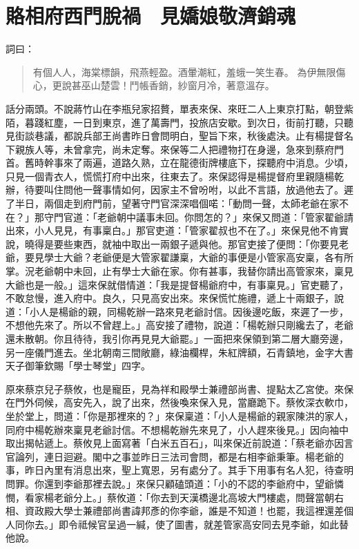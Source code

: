 
\chapter{賂相府西門脫禍　見嬌娘敬濟銷魂}

詞曰：
\begin{quote}
有個人人，海棠標韻，飛燕輕盈。酒暈潮紅，羞蛾一笑生春。
為伊無限傷心，更說甚巫山楚雲！鬥帳香銷，紗窗月冷，著意溫存。
\end{quote}

話分兩頭。不說蔣竹山在李瓶兒家招贅，單表來保、來旺二人上東京打點，朝登紫陌，暮踐紅塵，一日到東京，進了萬壽門，投旅店安歇。到次日，街前打聽，只聽見街談巷議，都說兵部王尚書昨日會問明白，聖旨下來，秋後處決。止有楊提督名下親族人等，未曾拿完，尚未定奪。來保等二人把禮物打在身邊，急來到蔡府門首。舊時幹事來了兩遍，道路久熟，立在龍德街牌樓底下，探聽府中消息。少頃，只見一個青衣人，慌慌打府中出來，往東去了。來保認得是楊提督府里親隨楊乾辦，待要叫住問他一聲事情如何，因家主不曾吩咐，以此不言語，放過他去了。遲了半日，兩個走到府門前，望著守門官深深唱個喏：「動問一聲，太師老爺在家不在？」那守門官道：「老爺朝中議事未回。你問怎的？」來保又問道：「管家翟爺請出來，小人見見，有事稟白。」那官吏道：「管家翟叔也不在了。」來保見他不肯實說，曉得是要些東西，就袖中取出一兩銀子遞與他。那官吏接了便問：「你要見老爺，要見學士大爺？老爺便是大管家翟謙稟，大爺的事便是小管家高安稟，各有所掌。況老爺朝中未回，止有學士大爺在家。你有甚事，我替你請出高管家來，稟見大爺也是一般。」這來保就借情道：「我是提督楊爺府中，有事稟見。」官吏聽了，不敢怠慢，進入府中。良久，只見高安出來。來保慌忙施禮，遞上十兩銀子，說道：「小人是楊爺的親，同楊乾辦一路來見老爺討信。因後邊吃飯，來遲了一步，不想他先來了。所以不曾趕上。」高安接了禮物，說道：「楊乾辦只剛纔去了，老爺還未散朝。你且待待，我引你再見見大爺罷。」一面把來保領到第二層大廳旁邊，另一座儀門進去。坐北朝南三間敞廳，綠油欄桿，朱紅牌額，石青鎮地，金字大書天子御筆欽賜「學士琴堂」四字。

原來蔡京兒子蔡攸，也是寵臣，見為祥和殿學士兼禮部尚書、提點太乙宮使。來保在門外伺候，高安先入，說了出來，然後喚來保入見，當廳跪下。蔡攸深衣軟巾，坐於堂上，問道：「你是那裡來的？」來保稟道：「小人是楊爺的親家陳洪的家人，同府中楊乾辦來稟見老爺討信。不想楊乾辦先來見了，小人趕來後見。」因向袖中取出揭帖遞上。蔡攸見上面寫著「白米五百石」，叫來保近前說道：「蔡老爺亦因言官論列，連日迴避。閣中之事並昨日三法司會問，都是右相李爺秉筆。楊老爺的事，昨日內里有消息出來，聖上寬恩，另有處分了。其手下用事有名人犯，待查明問罪。你還到李爺那裡去說。」來保只顧磕頭道：「小的不認的李爺府中，望爺憐憫，看家楊老爺分上。」蔡攸道：「你去到天漢橋邊北高坡大門樓處，問聲當朝右相、資政殿大學士兼禮部尚書諱邦彥的你李爺，誰是不知道！也罷，我這裡還差個人同你去。」即令祗候官呈過一緘，使了圖書，就差管家高安同去見李爺，如此替他說。

